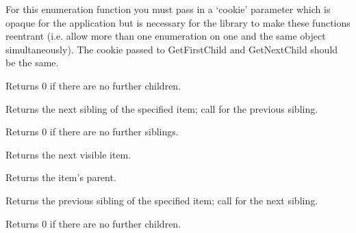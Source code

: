 For this enumeration function you must pass in a `cookie' parameter
which is opaque for the application but is necessary for the library
to make these functions reentrant (i.e. allow more than one
enumeration on one and the same object simultaneously). The cookie passed to
GetFirstChild and GetNextChild should be the same.

Returns 0 if there are no further children.



\label{wxtreectrlgetnextsibling}


Returns the next sibling of the specified item; call  for the previous sibling.

Returns 0 if there are no further siblings.



\label{wxtreectrlgetnextvisible}


Returns the next visible item.

\label{wxtreectrlgetparent}


Returns the item's parent.

\label{wxtreectrlgetprevsibling}


Returns the previous sibling of the specified item; call  for the next sibling.

Returns 0 if there are no further children.



\label{wxtreectrlgetprevvisible}

